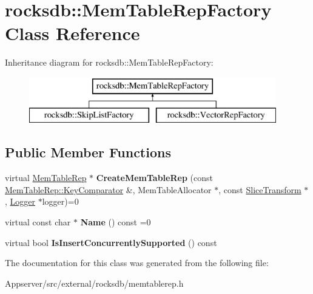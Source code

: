 \hypertarget{classrocksdb_1_1MemTableRepFactory}{}\section{rocksdb\+:\+:Mem\+Table\+Rep\+Factory Class Reference}
\label{classrocksdb_1_1MemTableRepFactory}
Inheritance diagram for rocksdb\+:\+:Mem\+Table\+Rep\+Factory\+:\begin{figure}[H]
\begin{center}
\leavevmode
\includegraphics[height=2.000000cm]{classrocksdb_1_1MemTableRepFactory}
\end{center}
\end{figure}
\subsection*{Public Member Functions}
\begin{DoxyCompactItemize}
\item 
virtual \hyperlink{classrocksdb_1_1MemTableRep}{Mem\+Table\+Rep} $\ast$ {\bfseries Create\+Mem\+Table\+Rep} (const \hyperlink{classrocksdb_1_1MemTableRep_1_1KeyComparator}{Mem\+Table\+Rep\+::\+Key\+Comparator} \&, Mem\+Table\+Allocator $\ast$, const \hyperlink{classrocksdb_1_1SliceTransform}{Slice\+Transform} $\ast$, \hyperlink{classrocksdb_1_1Logger}{Logger} $\ast$logger)=0\hypertarget{classrocksdb_1_1MemTableRepFactory_a87a40d71a4ef4af55eb97ca0da7506fb}{}\label{classrocksdb_1_1MemTableRepFactory_a87a40d71a4ef4af55eb97ca0da7506fb}

\item 
virtual const char $\ast$ {\bfseries Name} () const =0\hypertarget{classrocksdb_1_1MemTableRepFactory_ab2d3393c71b0e230c7b68efe8e789bea}{}\label{classrocksdb_1_1MemTableRepFactory_ab2d3393c71b0e230c7b68efe8e789bea}

\item 
virtual bool {\bfseries Is\+Insert\+Concurrently\+Supported} () const\hypertarget{classrocksdb_1_1MemTableRepFactory_a4157b1b98dcb4e2e7f0e5d41aa1025b4}{}\label{classrocksdb_1_1MemTableRepFactory_a4157b1b98dcb4e2e7f0e5d41aa1025b4}

\end{DoxyCompactItemize}


The documentation for this class was generated from the following file\+:\begin{DoxyCompactItemize}
\item 
Appserver/src/external/rocksdb/memtablerep.\+h\end{DoxyCompactItemize}
